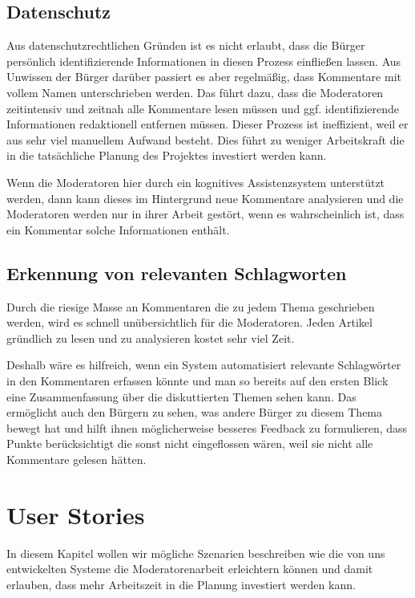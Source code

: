 \documentclass[runningheads]{llncs}
\begin{document}
	\subsection{Datenschutz}
		Aus datenschutzrechtlichen Gründen ist es nicht erlaubt, dass die Bürger persönlich identifizierende Informationen in diesen Prozess einfließen lassen.
		Aus Unwissen der Bürger darüber passiert es aber regelmäßig, dass Kommentare mit vollem Namen unterschrieben werden.
		Das führt dazu, dass die Moderatoren zeitintensiv und zeitnah alle Kommentare lesen müssen und ggf. identifizierende Informationen redaktionell entfernen müssen.
		Dieser Prozess ist ineffizient, weil er aus sehr viel manuellem Aufwand besteht.
		Dies führt zu weniger Arbeitskraft die in die tatsächliche Planung des Projektes investiert werden kann.
		
		Wenn die Moderatoren hier durch ein kognitives Assistenzsystem unterstützt werden, dann kann dieses im Hintergrund neue Kommentare analysieren und die Moderatoren werden nur in ihrer Arbeit gestört, wenn es wahrscheinlich ist, dass ein Kommentar solche Informationen enthält.
	
	\subsection{Erkennung von relevanten Schlagworten}
		Durch die riesige Masse an Kommentaren die zu jedem Thema geschrieben werden, wird es schnell unübersichtlich für die Moderatoren.
		Jeden Artikel gründlich zu lesen und zu analysieren kostet sehr viel Zeit.
		
		Deshalb wäre es hilfreich, wenn ein System automatisiert relevante Schlagwörter in den Kommentaren erfassen könnte und man so bereits auf den ersten Blick eine Zusammenfassung über die diskuttierten Themen sehen kann.
		Das ermöglicht auch den Bürgern zu sehen, was andere Bürger zu diesem Thema bewegt hat und hilft ihnen möglicherweise besseres Feedback zu formulieren, dass Punkte berücksichtigt die sonst nicht eingeflossen wären, weil sie nicht alle Kommentare gelesen hätten.

\section{User Stories}
	In diesem Kapitel wollen wir mögliche Szenarien beschreiben wie die von uns entwickelten Systeme die Moderatorenarbeit erleichtern können und damit erlauben, dass mehr Arbeitszeit in die Planung investiert werden kann.
	
\end{document}
